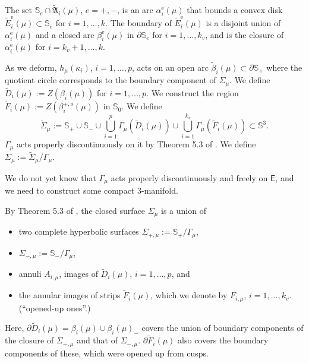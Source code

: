 \documentclass{amsart}
\numberwithin{equation}{section}
\newcommand\SI{{\mathbb{S}}}
\newcommand\eps{\epsilon}
\newcommand\Ss{{\mathbb{S}}}
\newcommand\Lspace{\mathsf E}
\theoremstyle{definition}
\theoremstyle{remark}
\newcommand{\rome}{\mathrm e}
\begin{document}
The set $\Ss_e \cap \tilde {\mathfrak{A}}_i(\mu)$, $e=+, -$, is an arc $\alpha_i^{\rome}(\mu)$ that bounds a convex disk 
$\tilde E_i^{\rome}(\mu) \subset \Ss_e$ for $i=1, \dots, k$. 
The boundary of $\tilde E_i^{\rome}(\mu)$ is a disjoint union of $\alpha_i^{\rome}(\mu)$ and 
a closed arc 
$\beta_i^{\rome}(\mu)$ in $\partial \Ss_e$ for $i=1, \dots, k_v$, and
is the closure of 
$\alpha_i^{\rome}(\mu)$ for $i = k_v +1, \dots, k$. 

As we deform, $h_\mu(\kappa_i)$, $i=1,\dots, p$, 
acts on an open arc $\tilde \beta_i(\mu)\subset \partial \Ss_+$ where 
the quotient circle corresponds to the boundary component of $\Sigma_\mu$. 
We define $\tilde D_i(\mu) := Z(\beta_i(\mu))$ for $i= 1, \dots, p$. 
We construct the region $\tilde F_i(\mu):= Z(\beta_i^{+, o}(\mu))$ in $\Ss_0$.
We define 
\[\tilde \Sigma_\mu:= \Ss_+ \cup \Ss_- \cup 
\bigcup_{i=1}^p \Gamma_\mu(\tilde D_i(\mu))\cup 
\bigcup_{i=1}^{k_v} \Gamma_\mu(\tilde F_i(\mu)) \subset \SI^3.\]
$\Gamma_\mu$ acts properly discontinuously on it by Theorem 5.3 of \cite{CG17}. 
We define $\Sigma_\mu:= \tilde \Sigma_\mu/\Gamma_\mu$. 



We do not yet know that $\Gamma_\mu$ acts properly discontinuously and freely on $\Lspace$, 
and we need to construct some compact $3$-manifold. 


By Theorem  5.3 of \cite{CG17}, 
the  closed surface $\Sigma_\mu$ is a union of 
\begin{itemize} 
\item two complete hyperbolic 
surfaces $\Sigma_{+, \mu}:= \Ss_+/\Gamma_\mu$, 
\item  $\Sigma_{-, \mu}:= \Ss_-/\Gamma_\mu$,  
\item annuli $A_{i, \mu}$, 
images of $\tilde D_i(\mu)$, $i=1, \dots, p$, and 
\item the annular images  of strips 
$\tilde F_i(\mu)$, which we denote by $F_{i, \mu}$,  $i=1, \dots, k_v$.  (``opened-up ones''.) 
\end{itemize} 
Here, $\partial \tilde D_i(\mu) = \beta_i(\mu) \cup \beta_{i}(\mu)_-$ 
covers the union of 
boundary components of 
the closure of $\Sigma_{+, \mu}$ and that of $\Sigma_{-, \mu}$. 
$\partial \tilde F_i(\mu)$ also covers the boundary components of these, 
which were opened up from cusps.  
\end{document}

